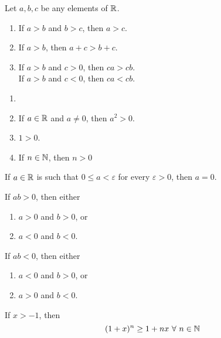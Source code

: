 \begin{theorem}
	Let $a,b,c$ be any elements of $\mathbb{R}$.
	\begin{enumerate}
		\item If $a>b$ and $b>c$, then $a>c$.
		\item If $a>b$, then $a+c>b+c$.
		\item If $a>b$ and $c>0$, then $ca>cb$.
		      \\If $a>b$ and $c<0$, then $ca<cb$.
	\end{enumerate}
\end{theorem}

\begin{theorem}
	\begin{enumerate}
		\item[]
		\item If $a \in \mathbb{R}$ and $a \neq 0$, then $a^2>0$.
		\item $1 >0$.
		\item If $n \in \mathbb{N}$, then $n >0$
	\end{enumerate}
\end{theorem}

\begin{theorem}
	If $a \in \mathbb{R}$ is such that $0 \leq a < \varepsilon$ for every $\varepsilon>0$, then $a=0$.
\end{theorem}

\begin{theorem}
	If $ab>0$, then either
	\begin{enumerate}
		\item $a>0$ and $b>0$, or
		\item $a<0$ and $b<0$.
	\end{enumerate}
\end{theorem}

\begin{corollary}
	If $ab <0$, then either
	\begin{enumerate}
		\item $a<0$ and $b>0$, or
		\item $a>0$ and $b<0$.
	\end{enumerate}
\end{corollary}

\begin{definition}
	If $x>-1$, then
	\[(1+x)^n \geq 1+nx\ \forall\ n \in \mathbb{N}\]
\end{definition}
